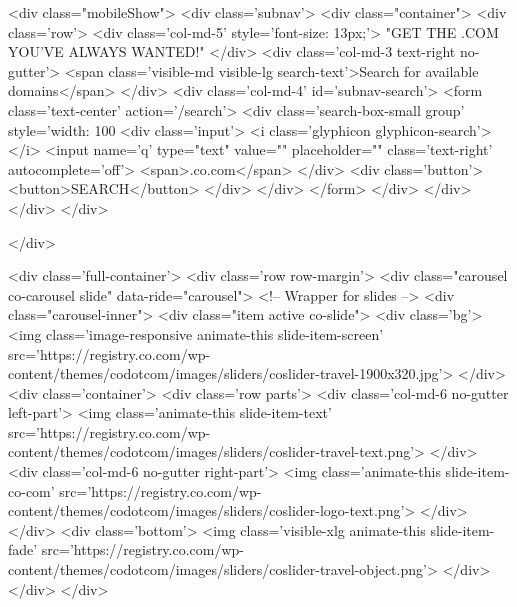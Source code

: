 <div class="mobileShow">
<div class='subnav'>
	  <div class="container">
        <div class='row'>
            <div class='col-md-5' style='font-size: 13px;'>
                "GET THE .COM YOU'VE ALWAYS WANTED!"            </div>
            <div class='col-md-3 text-right no-gutter'>
                <span class='visible-md visible-lg search-text'>Search for available domains</span> 
            </div>
            <div class='col-md-4' id='subnav-search'>
                <form class='text-center' action='/search'>
                    <div class='search-box-small group' style='width: 100%
                        <div class='input'> 
                            <i class='glyphicon glyphicon-search'></i>
                            <input name='q' type="text" value="" placeholder="" class='text-right' autocomplete='off'>
                            <span>.co.com</span>
                        </div>
                        <div class='button'>
                            <button>SEARCH</button>
                        </div>
                    </div>
                </form>
            </div>
        </div>
    </div>
</div>


</div>

<div class='full-container'>
    <div class='row row-margin'>
        <div class="carousel co-carousel slide" data-ride="carousel">
            <!-- Wrapper for slides -->
            <div class="carousel-inner">
                <div class="item active co-slide">
                    <div class='bg'>
                        <img class='image-responsive animate-this slide-item-screen' src='https://registry.co.com/wp-content/themes/codotcom/images/sliders/coslider-travel-1900x320.jpg'>
                    </div>
                    <div class='container'>
                        <div class='row parts'>
                            <div class='col-md-6 no-gutter left-part'>
                                <img class='animate-this slide-item-text' src='https://registry.co.com/wp-content/themes/codotcom/images/sliders/coslider-travel-text.png'>
                            </div>
                            <div class='col-md-6 no-gutter right-part'>
                                <img class='animate-this slide-item-co-com' src='https://registry.co.com/wp-content/themes/codotcom/images/sliders/coslider-logo-text.png'>
                            </div>
                        </div>
                        <div class='bottom'>
                            <img class='visible-xlg animate-this slide-item-fade' src='https://registry.co.com/wp-content/themes/codotcom/images/sliders/coslider-travel-object.png'>
                        </div>
                    </div>
                </div>

